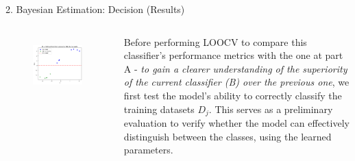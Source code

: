 \documentclass[aspectratio=169,xcolor=dvipsnames]{beamer}
\begin{document}
\begin{frame}{2. Bayesian Estimation: Decision (Results)}

    \begin{columns}[c] %

        \begin{figure}
            \centering
            \includegraphics[width=1.15\linewidth]{out/plot6_discriminantValuesPartB.png}
            \label{fig:1}
        \end{figure}
        

        Before performing LOOCV to compare this classifier's performance metrics with the one at part A - \textit{to gain a clearer understanding of the superiority of the current classifier (B) over the previous one}, we first test the model's ability to correctly classify the training datasets $D_j$. This serves as a preliminary evaluation to verify whether the model can effectively distinguish between the classes, using the learned parameters.

    \end{columns}

\end{frame}

\end{document}
